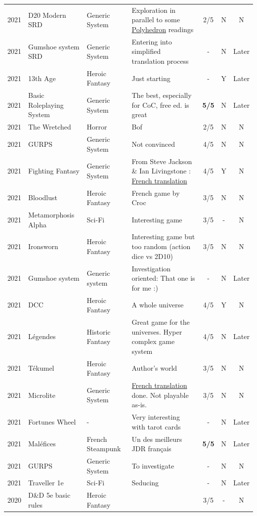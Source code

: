 \documentclass[a4paper, 11pt, twoside]{article}
\begin{document}
\begin{longtable}{cp{2cm}p{1.5cm}p{7cm}ccc}
2021 & D20 Modern SRD & Generic System & Exploration in parallel to some \href{https://archive.org/details/Polyhedron105}{Polyhedron} readings & 2/5 & N & N\\
2021 & Gumshoe system SRD & Generic System & Entering into simplified translation process & - & N & Later\\
2021 & 13th Age & Heroic Fantasy & Just starting & - & Y & Later\\
2021 & Basic Roleplaying System & Generic System & The best, especially for CoC, free ed. is great & \textbf{5/5} & N & Later\\
2021 & The Wretched & Horror & Bof & 2/5 & N & N\\
2021 & GURPS & Generic System & Not convinced & 4/5 & N & N\\
2021 & Fighting Fantasy & Generic System & From Steve Jackson \& Ian Livingstone : \href{https://github.com/orey/jdr/tree/master/FightingFantasys-fr}{French translation} & 4/5 & Y & N\\
2021 & Bloodlust & Heroic Fantasy & French game by Croc & 3/5 & N & N\\
2021 & Metamorphosis Alpha & Sci-Fi & Interesting game & 3/5 & - & N\\
2021 & Ironsworn & Heroic Fantasy & Interesting game but too random (action dice vs 2D10) & 3/5 & N & N\\
2021 & Gumshoe system & Generic system & Investigation oriented: That one is for me :) & - & N & Later\\
2021 & DCC & Heroic Fantasy & A whole universe & 4/5 & Y & N\\
2021 & Légendes & Historic Fantasy & Great game for the universes. Hyper complex game system & 4/5 & N & Later\\
2021 & Tékumel & Heroic Fantasy & Author's world & 3/5 & N & N\\
2021 & Microlite & Generic System & \href{https://github.com/orey/jdr/tree/master/Microlite20-fr}{French translation} done. Not playable as-is. & 3/5 & N & N\\
2021 & Fortunes Wheel & - & Very interesting with tarot cards & - & N & Later\\
2021 & Maléfices & French Steampunk & Un des meilleurs JDR français & \textbf{5/5} & N & Later\\
2021 & GURPS & Generic System & To investigate & - & N & N\\
2021 & Traveller 1e & Sci-Fi & Seducing & - & N & Later\\
2020 & D\&D 5e basic rules & Heroic Fantasy &  & 3/5 & - & N\\

\end{longtable}
\end{document}
